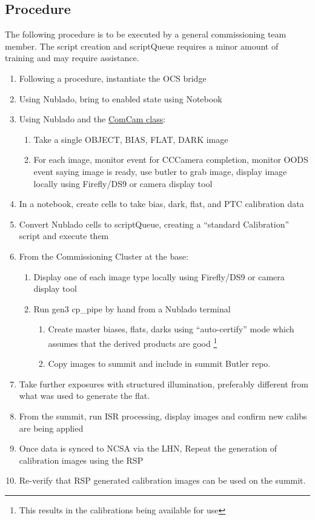 \subsection{Procedure}
The following procedure is to be executed by a general commissioning team member. The script creation and scriptQueue requires a minor amount of training and may require assistance.
\begin{enumerate}
	\item Following a procedure, instantiate the OCS bridge
	\item Using Nublado, bring to enabled state using Notebook
	\item Using Nublado and the \href{https://ts-observatory-control.lsst.io/py-api/lsst.ts.observatory.control.maintel.ComCam.html}{ComCam class}:
	\begin{enumerate}
 		\item Take a single OBJECT, BIAS, FLAT, DARK image
 		\item For each image, monitor event for CCCamera completion, monitor \gls{OODS} event saying image is ready, use butler to grab image, display image locally using Firefly/DS9 or camera display tool
    \end{enumerate}	
	\item In a notebook, create cells to take bias, dark, flat, and PTC calibration data
	\item Convert Nublado cells to \gls{scriptQueue}, creating a ``standard Calibration'' script and execute them
	\item From the Commissioning Cluster at the base:
	\begin{enumerate}
		\item Display one of each image type locally using Firefly/DS9 or camera display tool
		\item Run gen3 \gls{cp_pipe} by hand from a Nublado terminal
    	\begin{enumerate}
    		\item Create master biases, flats, darks using ``auto-certify'' mode which assumes that the derived products are good \footnote{This results in the calibrations being available for use}
    		\item Copy images to summit and include in summit Butler repo.
    	\end{enumerate}
  	\end{enumerate}
 	\item Take further exposures with structured illumination, preferably different from what was used to generate the flat.
  	\item From the summit, run \gls{ISR} processing, display images and confirm new calibs are being applied
	\item Once data is synced to NCSA via the \gls{LHN}, Repeat the generation of calibration images using the \gls{RSP}
	\item Re-verify that \gls{RSP} generated calibration images can be used on the summit.
\end{enumerate}
